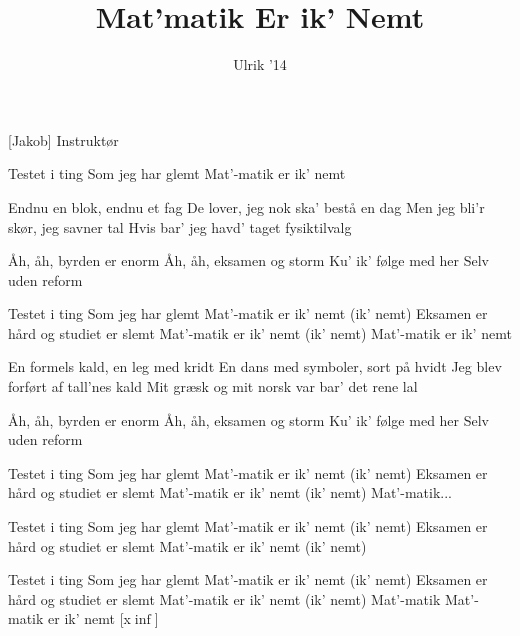 \documentclass[a4paper,11pt]{article}
\title{Mat'matik Er ik' Nemt}
\author{Ulrik '14}
\begin{document}
\maketitle

\begin{roles}
[Jakob] Instruktør
\end{roles}

\begin{song}
 Testet i ting
Som jeg har glemt
Mat'-matik er ik' nemt

 Endnu en blok, endnu et fag
De lover, jeg nok ska' bestå en dag
Men jeg bli'r skør, jeg savner tal
Hvis bar' jeg havd' taget fysiktilvalg

 Åh, åh, byrden er enorm
Åh, åh, eksamen og storm
Ku' ik' følge med her
Selv uden reform

 Testet i ting
Som jeg har glemt
Mat'-matik er ik' nemt (ik' nemt)
Eksamen er hård
og studiet er slemt
Mat'-matik er ik' nemt (ik' nemt)
Mat'-matik er ik' nemt

 En formels kald, en leg med kridt
En dans med symboler, sort på hvidt
Jeg blev forført af tall'nes kald
Mit græsk og mit norsk var bar' det rene lal

 Åh, åh, byrden er enorm
Åh, åh, eksamen og storm
Ku' ik' følge med her
Selv uden reform


 Testet i ting
Som jeg har glemt
Mat'-matik er ik' nemt (ik' nemt)
Eksamen er hård
og studiet er slemt
Mat'-matik er ik' nemt (ik' nemt)
Mat'-matik...

 Testet i ting
Som jeg har glemt
Mat'-matik er ik' nemt (ik' nemt)
Eksamen er hård
og studiet er slemt
Mat'-matik er ik' nemt (ik' nemt)

 Testet i ting
Som jeg har glemt
Mat'-matik er ik' nemt (ik' nemt)
Eksamen er hård
og studiet er slemt
Mat'-matik er ik' nemt (ik' nemt)
Mat'-matik 
Mat'-matik 
er ik' nemt [x$\inf$]




\end{song}
\end{document}
